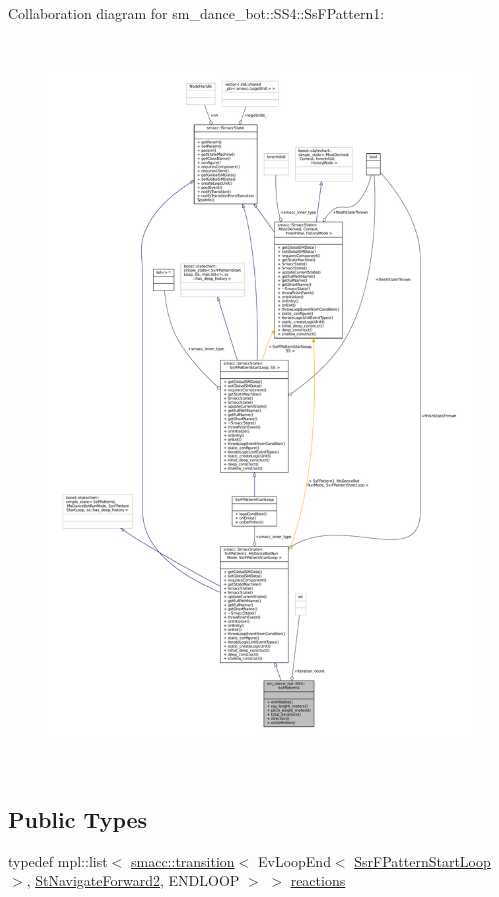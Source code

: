 Collaboration diagram for sm\+\_\+dance\+\_\+bot\+:\+:S\+S4\+:\+:Ss\+F\+Pattern1\+:
\nopagebreak
\begin{figure}[H]
\begin{center}
\leavevmode
\includegraphics[height=550pt]{structsm__dance__bot_1_1SS4_1_1SsFPattern1__coll__graph}
\end{center}
\end{figure}
\subsection*{Public Types}
\begin{DoxyCompactItemize}
\item 
typedef mpl\+::list$<$ \hyperlink{classsmacc_1_1transition}{smacc\+::transition}$<$ Ev\+Loop\+End$<$ \hyperlink{structSsrFPatternStartLoop}{Ssr\+F\+Pattern\+Start\+Loop} $>$, \hyperlink{structsm__dance__bot_1_1StNavigateForward2}{St\+Navigate\+Forward2}, E\+N\+D\+L\+O\+OP $>$ $>$ \hyperlink{structsm__dance__bot_1_1SS4_1_1SsFPattern1_a05396306207d1bd51cbe752f6b97b24d}{reactions}
\end{DoxyCompactItemize}
